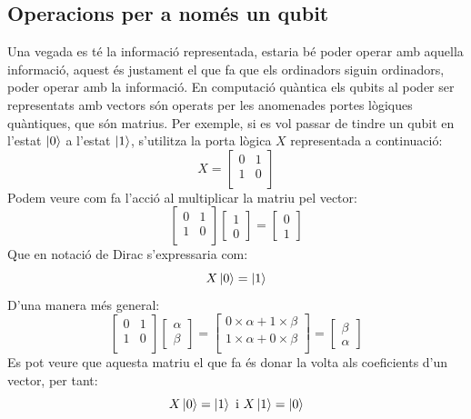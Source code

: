 \subsection{Operacions per a només un qubit}
\label{only_one_qubit}
Una vegada es té la informació representada, estaria bé poder operar amb aquella informació, aquest és justament el que fa que els ordinadors siguin ordinadors, poder operar amb la informació. En computació quàntica els qubits al poder ser representats amb vectors són operats per les anomenades portes lògiques quàntiques, que són matrius. Per exemple, si es vol passar de tindre un qubit en l'estat $\ket{0}$ a l'estat $\ket{1}$, s'utilitza la porta lògica $X$ representada a continuació:
$$
X = \begin{bmatrix}
	0 & 1\\
	1 & 0\\
\end{bmatrix}
$$ 
Podem veure com fa l'acció al multiplicar la matriu pel vector:
$$
\begin{bmatrix} 0 & 1\\ 1 & 0\\ \end{bmatrix} \begin{bmatrix}1 \\ 0 \end{bmatrix} = \begin{bmatrix}0 \\ 1 \end{bmatrix}
$$
Que en notació de Dirac s'expressaria com: 
$$
X\ket{0} = \ket{1}
$$
D'una manera més general: 
$$
\begin{bmatrix} 0 & 1\\ 1 & 0\\ \end{bmatrix} 
\begin{bmatrix}\alpha \\ \beta \end{bmatrix} =
\begin{bmatrix} 0\times\alpha + 1\times\beta \\1\times\alpha + 0\times\beta \\
\end{bmatrix}
= \begin{bmatrix} \beta \\ \alpha \end{bmatrix}
$$
Es pot veure que aquesta matriu el que fa és donar la volta als coeficients d'un vector, per tant:
$$
X\ket{0} = \ket{1} \text{ i } X\ket{1} = \ket{0}
$$

